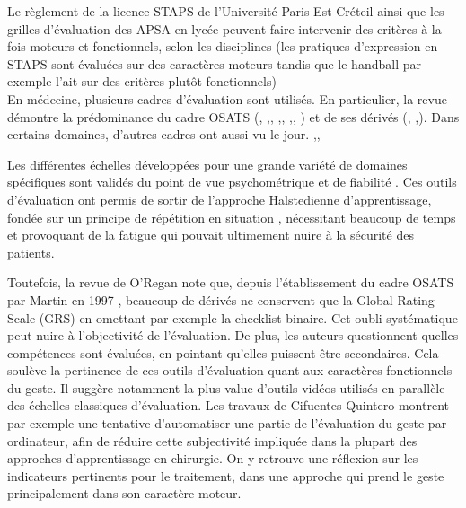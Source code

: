 \documentclass{article}
\begin{document}
Le règlement de la licence STAPS de l'Université Paris-Est Créteil 
\cite{universite_paris-est_creteil_livret_2022} ainsi que les grilles 
d'évaluation des APSA en lycée 
\cite{ministere_de_leducation_nationale_referentiel_nodate} peuvent faire 
intervenir des critères à la fois moteurs et fonctionnels, selon les 
disciplines (les pratiques d'expression en STAPS sont évaluées sur des 
caractères moteurs tandis que le handball par exemple l'ait sur des 
critères plutôt fonctionnels)
\\

En médecine, plusieurs cadres d'évaluation sont utilisés. En particulier,
la revue démontre la prédominance du cadre OSATS (\cite{niitsu_using_2013},
\cite{fouillen_development_2023},\cite{kanoksin_development_2026},
\cite{vanheest_objective_2012},\cite{treil_objective_2022},
\cite{martin_objective_1997},\cite{rodriguez_objective_2025},
\cite{asif_objective_2022}) et de ses dérivés (\cite{schmidt_development_2022},
\cite{doyle_universal_2007},\cite{williams_template_2012}). Dans 
certains domaines, d'autres cadres ont aussi vu le jour.
\cite{vassiliou_global_2005},\cite{gofton_ottawa_2012},\cite{sedlack_mayo_2010}

Les différentes échelles développées pour une grande variété de domaines
spécifiques sont validés du point de vue psychométrique et de fiabilité
\cite{llado_grove_use_2015}. Ces outils d'évaluation ont permis de sortir
de l'approche Halstedienne d'apprentissage, fondée sur un principe de 
répétition en situation \cite{ghaderi_technical_2015}, nécessitant
beaucoup de temps et provoquant de la fatigue qui pouvait ultimement
nuire à la sécurité des patients.

Toutefois, la revue de O'Regan \cite{oregan_scoping_2026} note que, depuis
l'établissement du cadre OSATS par Martin en 1997 
\cite{martin_objective_1997}, beaucoup de dérivés ne conservent que la
Global Rating Scale (GRS) en omettant par exemple la checklist binaire.
Cet oubli systématique peut nuire à l'objectivité de l'évaluation. De
plus, les auteurs questionnent quelles compétences sont évaluées, en
pointant qu'elles puissent être secondaires. Cela soulève la pertinence
de ces outils d'évaluation quant aux caractères fonctionnels du geste. Il
suggère notamment la plus-value d'outils vidéos utilisés en parallèle des
échelles classiques d'évaluation.
Les travaux de Cifuentes Quintero \cite{cifuentes_quintero_development_2015}
montrent par exemple une tentative d'automatiser une partie de l'évaluation
du geste par ordinateur, afin de réduire cette subjectivité impliquée
dans la plupart des approches d'apprentissage en chirurgie. On y retrouve
une réflexion sur les indicateurs pertinents pour le traitement, dans
une approche qui prend le geste principalement dans son caractère moteur.
\\
\end{document}
